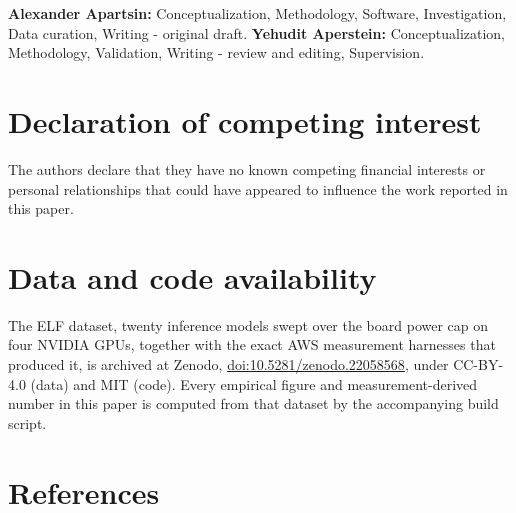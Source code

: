 \textbf{Alexander Apartsin:} Conceptualization, Methodology, Software, Investigation, Data curation, Writing - original draft. \textbf{Yehudit Aperstein:} Conceptualization, Methodology, Validation, Writing - review and editing, Supervision.

\section{Declaration of competing interest}\label{declaration-of-competing-interest}

The authors declare that they have no known competing financial interests or personal relationships that could have appeared to influence the work reported in this paper.

\section{Data and code availability}\label{data-and-code-availability}

The ELF dataset, twenty inference models swept over the board power cap on four NVIDIA GPUs, together with
the exact AWS measurement harnesses that produced it, is archived at Zenodo,
\href{https://doi.org/10.5281/zenodo.22058568}{doi:10.5281/zenodo.22058568}, under CC-BY-4.0 (data) and
MIT (code). Every empirical figure and measurement-derived number in this paper is computed from that dataset by the accompanying
build script.

\section{References}\label{references}
